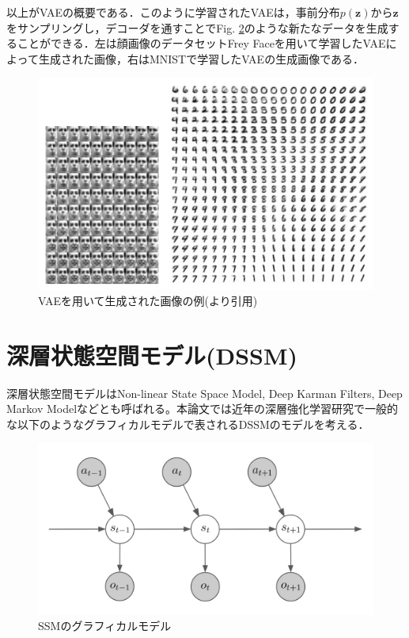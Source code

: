 以上がVAEの概要である．このように学習されたVAEは，事前分布$p(\bm{z})$から$\bm{z}$をサンプリングし，デコーダを通すことでFig. \ref{fig:vae_example}のような新たなデータを生成することができる．左は顔画像のデータセットFrey Faceを用いて学習したVAEによって生成された画像，右はMNISTで学習したVAEの生成画像である．


\begin{figure}[tbp]
  \begin{center}
    \includegraphics[width=\linewidth]{./figures/vae.png}
    \caption{VAEを用いて生成された画像の例(\cite{vae}より引用)}
    \label{fig:vae_example}
  \end{center}
\end{figure}

\section{深層状態空間モデル(DSSM)}
\label{section:dssm}

深層状態空間モデルはNon-linear State Space Model, Deep Karman Filters, Deep Markov Modelなどとも呼ばれる。本論文では近年の深層強化学習研究で一般的な以下のようなグラフィカルモデルで表されるDSSMのモデルを考える．

\begin{figure}[tbp]
  \begin{center}
    \includegraphics[width=\linewidth]{./figures/ssm.png}
    \caption{SSMのグラフィカルモデル}
    \label{fig:vae_example}
  \end{center}
\end{figure}